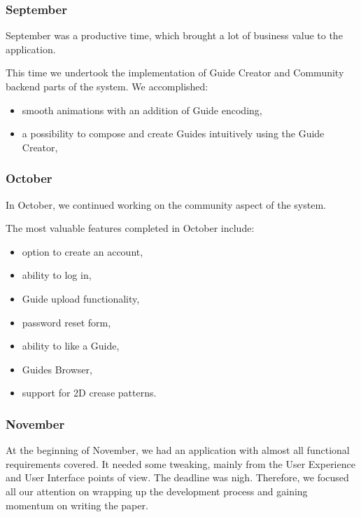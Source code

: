 \subsubsection{September}

September was a productive time, which brought a lot of business value to the application. 

This time we undertook the implementation of Guide Creator and Community backend parts of the system.
\medskip
We accomplished:

\begin{itemize}
	\item smooth animations with an addition of Guide encoding,
	\item a possibility to compose and create Guides intuitively using the Guide Creator,
\end{itemize}

\subsubsection{October}

In October, we continued working on the community aspect of the system. 

The most valuable features completed in October include:

\begin{itemize}
	\item option to create an account,
	\item ability to log in,
	\item Guide upload functionality,
	\item password reset form,
	\item ability to like a Guide,
	\item Guides Browser,
	\item support for 2D crease patterns.
\end{itemize}


\subsubsection{November}

At the beginning of November, we had an application with almost all functional requirements covered. It needed some tweaking, mainly from the User Experience and User Interface points of view. The deadline was nigh. Therefore, we focused all our attention on wrapping up the development process and gaining momentum on writing the paper.

